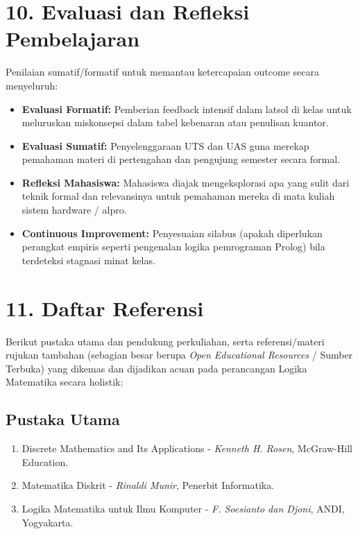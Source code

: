 \documentclass[12pt,a4paper]{article}
\begin{document}
\vspace{0.5cm}

\section*{10. Evaluasi dan Refleksi Pembelajaran}

Penilaian sumatif/formatif untuk memantau ketercapaian outcome secara menyeluruh:

\begin{itemize}[leftmargin=*]
  \item \textbf{Evaluasi Formatif:} Pemberian feedback intensif dalam latsol di kelas untuk meluruskan miskonsepsi dalam tabel kebenaran atau penulisan kuantor.
  \item \textbf{Evaluasi Sumatif:} Penyelenggaraan UTS dan UAS guna merekap pemahaman materi di pertengahan dan pengujung semester secara formal.
  \item \textbf{Refleksi Mahasiswa:} Mahasiswa diajak mengeksplorasi apa yang sulit dari teknik formal dan relevansinya untuk pemahaman mereka di mata kuliah sistem hardware / alpro.
  \item \textbf{Continuous Improvement:} Penyesuaian silabus (apakah diperlukan perangkat empiris seperti pengenalan logika pemrograman Prolog) bila terdeteksi stagnasi minat kelas.
\end{itemize}

\vspace{0.5cm}

\section*{11. Daftar Referensi}

Berikut pustaka utama dan pendukung perkuliahan, serta referensi/materi rujukan tambahan (sebagian besar berupa \textit{Open Educational Resources} / Sumber Terbuka) yang dikemas dan dijadikan acuan pada perancangan Logika Matematika secara holistik:

\subsection*{Pustaka Utama}
\begin{enumerate}[leftmargin=*, label={PU\arabic*.}]
  \item Discrete Mathematics and Its Applications - \textit{Kenneth H. Rosen}, McGraw-Hill Education.
  \item Matematika Diskrit - \textit{Rinaldi Munir}, Penerbit Informatika.
  \item Logika Matematika untuk Ilmu Komputer - \textit{F. Soesianto dan Djoni}, ANDI, Yogyakarta.
\end{enumerate}
\end{document}
